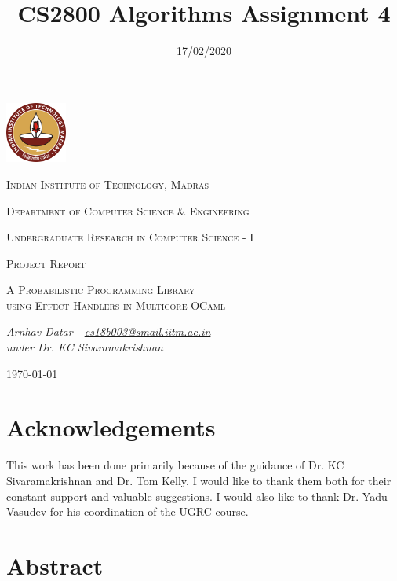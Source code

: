 \documentclass[a4paper,11pt]{article}
\title{CS2800 Algorithms Assignment \textnumero{} 4}
\date{17/02/2020}
\theoremstyle{mytheor}
\begin{document}
\begin{titlepage}
	\centering
	\includegraphics[width=0.15\textwidth]{ IIT.png} \par\vspace{1cm}
	{\scshape\LARGE Indian Institute of Technology, Madras \par}
	\vspace{0.5cm}
	{\scshape\large Department of Computer Science \& Engineering \par}
	\vspace{0.5cm}
	{\scshape\large Undergraduate Research in Computer Science - I\par}
	\vspace{1.5cm}
	{\scshape\Large Project Report\par}
	\vspace{1.5cm}
	{\scshape\Large A Probabilistic Programming Library\\ using Effect Handlers in Multicore OCaml \par}
	\vspace{1.5cm}
	{\huge\bfseries  \par}
	\vspace{2cm}
	{\Large\itshape 
	Arnhav Datar - \href{mailto:cs18b003@smail.iitm.ac.in}{cs18b003@smail.iitm.ac.in} \\ 
	under Dr. KC Sivaramakrishnan\par}
	\vfill

	{\large \today\par}
\end{titlepage}

\tableofcontents




\section{Acknowledgements}
\noindent
This work has been done primarily because of the guidance of Dr. KC Sivaramakrishnan and Dr. Tom Kelly. I would like to thank them both for their constant support and valuable suggestions. I would also like to thank Dr. Yadu Vasudev for his coordination of the UGRC course. 

\section{Abstract}
\end{document}
